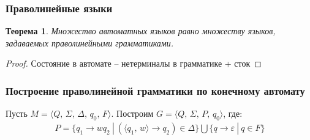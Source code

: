 \documentclass[a4paper,12pt]{article}
\theoremstyle{plain}
\newtheorem{theorem}{Теорема}[subsection]
\theoremstyle{definition}
\theoremstyle{remark}
\begin{document}
\subsubsection*{Праволинейные языки}
\begin{theorem}
	Множество автоматных языков равно множеству языков, задаваемых праволинейными грамматиками.
\end{theorem}

\begin{proof}
	Состояние в автомате -- нетерминалы в грамматике + сток
\end{proof}

\subsubsection*{Построение праволинейной грамматики по конечному автомату}
Пусть $M = \langle Q,\, \Sigma,\, \Delta,\, q_0,\, F\rangle$. Построим $G = \langle Q,\, \Sigma,\, P,\, q_0\rangle$, где:
\begin{align*}
	P = \{q_1 \to wq_2 \:|\: (\langle q_1,\, w\rangle \to q_2) \in \Delta\} \bigcup \{q \to \varepsilon \:|\: q \in F\}
\end{align*}
\end{document}
